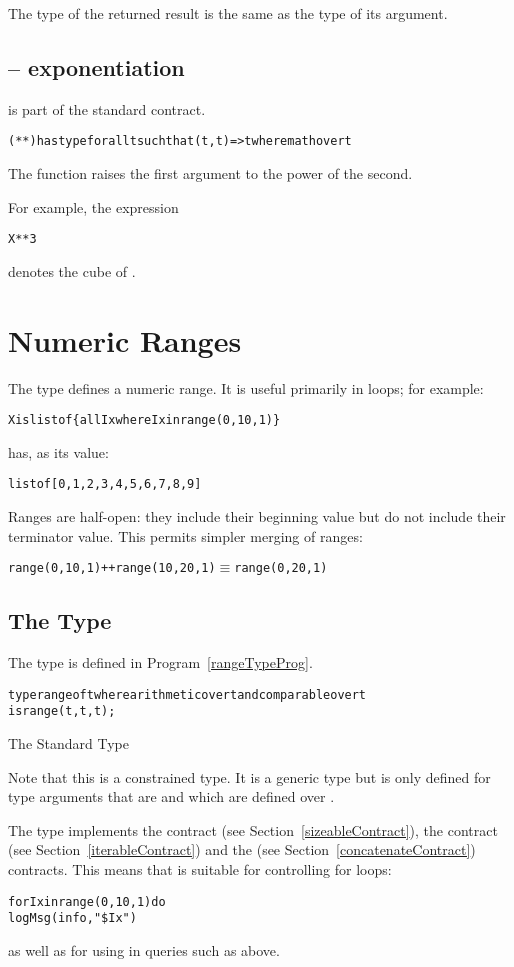 The type of the returned result is the same as the type of its argument.

\subsection{\q{**} -- exponentiation}
\label{powerFunction}
\q{**} is part of the standard  contract.
\begin{alltt}
(**) has type for all t such that (t,t)=>t where math over t
\end{alltt}
The \q{**} function raises the first argument to the power of the second.

For example, the expression
\begin{alltt}
X**3
\end{alltt}
denotes the cube of .

\section{Numeric Ranges}
\label{numericRange}
The  type defines a numeric range. It is useful primarily in loops; for example:
\begin{alltt}
X is list of \{all Ix where Ix in range(0,10,1) \}
\end{alltt}
has, as its value:
\begin{alltt}
list of [0, 1, 2, 3, 4, 5, 6, 7, 8, 9]
\end{alltt}

\begin{aside}
Ranges are half-open: they include their beginning value but do not include their terminator value. This permits simpler merging of ranges:
\begin{alltt}
range(0,10,1)++range(10,20,1) \ensuremath{\equiv} range(0,20,1)
\end{alltt}
\end{aside}

\subsection{The  Type}
The  type is defined in Program~\vref{rangeTypeProg}.
\begin{program}
\begin{alltt}
type range of t where arithmetic over t and comparable over t 
  is range(t,t,t);
\end{alltt}
\caption{The Standard  Type\label{rangeTypeProg}}
\end{program}

Note that this is a constrained type. It is a generic type but is only defined for type arguments that are  and which are defined over .

The  type implements the  contract (see Section~\vref{sizeableContract}), the  contract (see Section~\ref{iterableContract}) and the  (see Section~\vref{concatenateContract}) contracts. This means that  is suitable for controlling for loops:
\begin{alltt}
for Ix in range(0,10,1) do
  logMsg(info,"\$Ix")
\end{alltt}
as well as for using in queries such as above.
